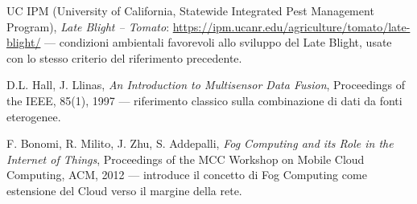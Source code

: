 \begin{enumerate}[leftmargin=1.4cm, label={[\arabic*]}]
    \item \label{bib:lateblight} UC IPM (University of California, Statewide Integrated
    Pest Management Program), \emph{Late Blight -- Tomato}:
    \url{https://ipm.ucanr.edu/agriculture/tomato/late-blight/} ---
    condizioni ambientali favorevoli allo sviluppo del Late Blight, usate
    con lo stesso criterio del riferimento precedente.

    \item \label{bib:datafusion} D.L. Hall, J. Llinas, \emph{An Introduction to
    Multisensor Data Fusion}, Proceedings of the IEEE, 85(1), 1997 ---
    riferimento classico sulla combinazione di dati da fonti eterogenee.

    \item \label{bib:fog} F. Bonomi, R. Milito, J. Zhu, S. Addepalli, \emph{Fog
    Computing and its Role in the Internet of Things}, Proceedings of the
    MCC Workshop on Mobile Cloud Computing, ACM, 2012 --- introduce il
    concetto di Fog Computing come estensione del Cloud verso il margine
    della rete.
\end{enumerate}
